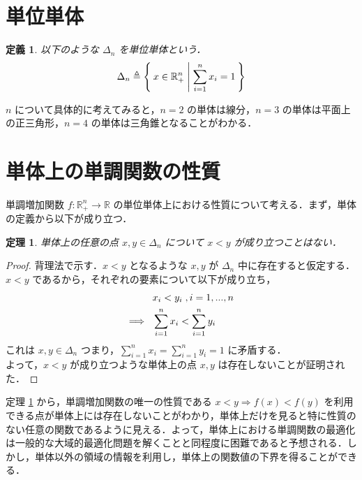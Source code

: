 \documentclass[a4paper,11pt]{jreport}
\newtheorem{definition}{定義}
\newtheorem{theorem}{定理}
\begin{document}
\section{単位単体}

\begin{definition}
以下のような $ \Delta_n $ を単位単体という．
$$ \Delta_n \triangleq \Set{ x \in \mathbb{R}^n_{+} | \sum_{i=1}^{n} x_i = 1 } $$
\end{definition}

$ n $ について具体的に考えてみると，$ n=2 $ の単体は線分，$ n=3 $ の単体は平面上の正三角形，$ n=4 $ の単体は三角錐となることがわかる．\par

\section{単体上の単調関数の性質} \label{sec:character_of_simplex_on_monotonic_function}

単調増加関数 $ f : \mathbb{R}^n_{+} \to \mathbb{R} $ の単位単体上における性質について考える．まず，単体の定義から以下が成り立つ．

\begin{theorem} \label{thm:inequality_on_simplex}
単体上の任意の点 $ x, y \in \Delta_n $ について $ x < y $ が成り立つことはない．
\end{theorem}

\begin{proof}
背理法で示す．$ x < y $ となるような $ x, y $ が $ \Delta_n $ 中に存在すると仮定する．\\
$ x < y $ であるから，それぞれの要素について以下が成り立ち，
\begin{align}
& x_i < y_i \;, i = 1, ..., n \notag \\
\Longrightarrow \hspace{8pt} & \sum_{i=1}^n x_i < \sum_{i=1}^n y_i \notag
\end{align}
これは $ x, y \in \Delta_n $ つまり，$ \sum_{i=1}^n x_i = \sum_{i=1}^n y_i = 1 $ に矛盾する．\\
よって，$ x < y $ が成り立つような単体上の点 $ x, y $ は存在しないことが証明された．
\end{proof}

定理 \ref{thm:inequality_on_simplex} から，単調増加関数の唯一の性質である $ x < y \Rightarrow f(x) < f(y) $ を利用できる点が単体上には存在しないことがわかり，単体上だけを見ると特に性質のない任意の関数であるように見える．よって，単体上における単調関数の最適化は一般的な大域的最適化問題を解くことと同程度に困難であると予想される．しかし，単体以外の領域の情報を利用し，単体上の関数値の下界を得ることができる．
\end{document}
